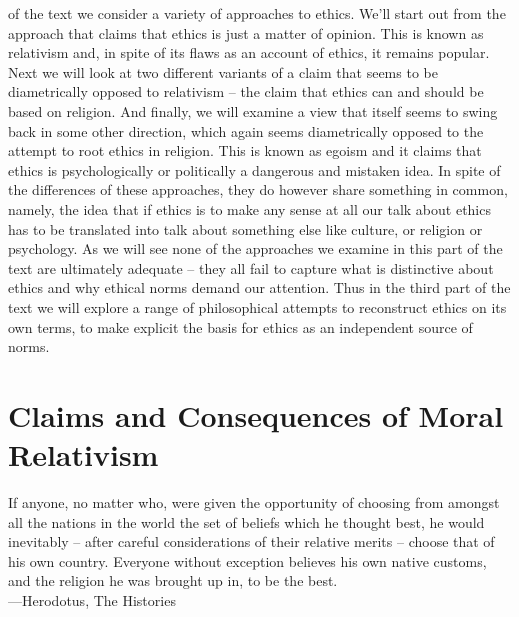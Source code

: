 \documentclass[justified]{tufte-book}
\newenvironment{epigraph}%
{
\begin{flushright}
\begin{minipage}{20em}
\begin{flushright}
\itshape
}%
{
\end{flushright}
\end{minipage}
\end{flushright}
}
\begin{document}
 of the text we consider a variety of approaches to ethics. We'll start out from the approach that claims that ethics is just a matter of opinion. This is known as relativism and, in spite of its flaws as an account of ethics, it remains popular. Next we will look at two different variants of a claim that seems to be diametrically opposed to relativism -- the claim that ethics can and should be based on religion. And finally, we will examine a view that itself seems to swing back in some other direction, which again seems diametrically opposed to the attempt to root ethics in religion. This is known as egoism and it claims that ethics is psychologically or politically a dangerous and mistaken idea. In spite of the differences of these approaches, they do however share something in common, namely, the idea that if ethics is to make any sense at all our talk about ethics has to be translated into talk about something else like culture, or religion or psychology. As we will see none of the approaches we examine in this part of the text are ultimately adequate -- they all fail to capture what is distinctive about ethics and why ethical norms demand our attention. Thus in the third part of the text we will explore a range of philosophical attempts to reconstruct ethics on its own terms, to make explicit the basis for ethics as an independent source of norms.

\hypertarget{claims-and-consequences-of-moral-relativism}{%
\section{Claims and Consequences of Moral Relativism}\label{claims-and-consequences-of-moral-relativism}}

\begin{epigraph}
If anyone, no matter who, were given the opportunity of choosing from
amongst all the nations in the world the set of beliefs which he thought
best, he would inevitably -- after careful considerations of their
relative merits -- choose that of his own country. Everyone without
exception believes his own native customs, and the religion he was
brought up in, to be the best.\\
---Herodotus, The Histories
\end{epigraph}
\end{document}
